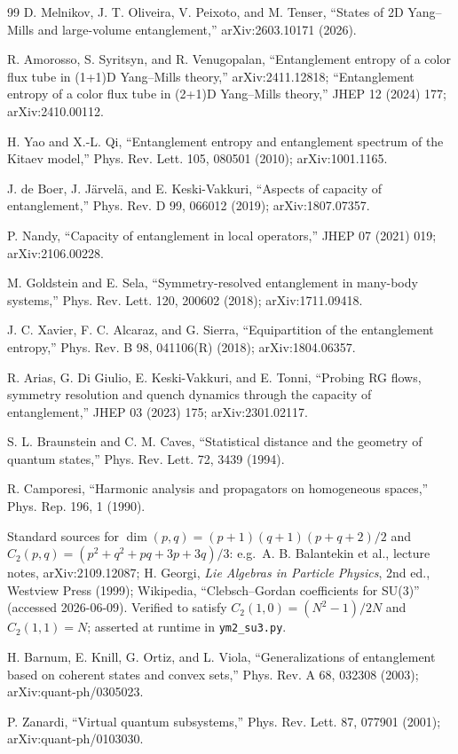 \documentclass[11pt]{article}
\theoremstyle{remark}
\theoremstyle{plain}
\begin{document}
\begin{thebibliography}{99}
 D. Melnikov, J. T. Oliveira, V. Peixoto, and M. Tenser, ``States of 2D Yang--Mills and large-volume entanglement,'' arXiv:2603.10171 (2026).

 R. Amorosso, S. Syritsyn, and R. Venugopalan, ``Entanglement entropy of a color flux tube in (1+1)D Yang--Mills theory,'' arXiv:2411.12818; ``Entanglement entropy of a color flux tube in (2+1)D Yang--Mills theory,'' JHEP 12 (2024) 177; arXiv:2410.00112.

 H. Yao and X.-L. Qi, ``Entanglement entropy and entanglement spectrum of the Kitaev model,'' Phys. Rev. Lett. 105, 080501 (2010); arXiv:1001.1165.

 J. de Boer, J. J\"arvel\"a, and E. Keski-Vakkuri, ``Aspects of capacity of entanglement,'' Phys. Rev. D 99, 066012 (2019); arXiv:1807.07357.

 P. Nandy, ``Capacity of entanglement in local operators,'' JHEP 07 (2021) 019; arXiv:2106.00228.

 M. Goldstein and E. Sela, ``Symmetry-resolved entanglement in many-body systems,'' Phys. Rev. Lett. 120, 200602 (2018); arXiv:1711.09418.

 J. C. Xavier, F. C. Alcaraz, and G. Sierra, ``Equipartition of the entanglement entropy,'' Phys. Rev. B 98, 041106(R) (2018); arXiv:1804.06357.

 R. Arias, G. Di Giulio, E. Keski-Vakkuri, and E. Tonni, ``Probing RG flows, symmetry resolution and quench dynamics through the capacity of entanglement,'' JHEP 03 (2023) 175; arXiv:2301.02117.

 S. L. Braunstein and C. M. Caves, ``Statistical distance and the geometry of quantum states,'' Phys. Rev. Lett. 72, 3439 (1994).

 R. Camporesi, ``Harmonic analysis and propagators on homogeneous spaces,'' Phys. Rep. 196, 1 (1990).

 Standard sources for $\dim(p,q) = (p+1)(q+1)(p+q+2)/2$ and $C_2(p,q) = (p^2+q^2+pq+3p+3q)/3$: e.g.\ A. B. Balantekin et al., lecture notes, arXiv:2109.12087; H. Georgi, \emph{Lie Algebras in Particle Physics}, 2nd ed., Westview Press (1999); Wikipedia, ``Clebsch--Gordan coefficients for SU(3)'' (accessed 2026-06-09). Verified to satisfy $C_2(1,0) = (N^2-1)/2N$ and $C_2(1,1) = N$; asserted at runtime in \texttt{ym2\_su3.py}.

 H. Barnum, E. Knill, G. Ortiz, and L. Viola, ``Generalizations of entanglement based on coherent states and convex sets,'' Phys. Rev. A 68, 032308 (2003); arXiv:quant-ph/0305023.

 P. Zanardi, ``Virtual quantum subsystems,'' Phys. Rev. Lett. 87, 077901 (2001); arXiv:quant-ph/0103030.

\end{thebibliography}

\end{document}
